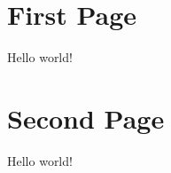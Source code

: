 \documentclass{article}
\begin{document}
\section{First Page}
Hello world!

\clearpage
\section{Second Page}
Hello world!
\end{document}
